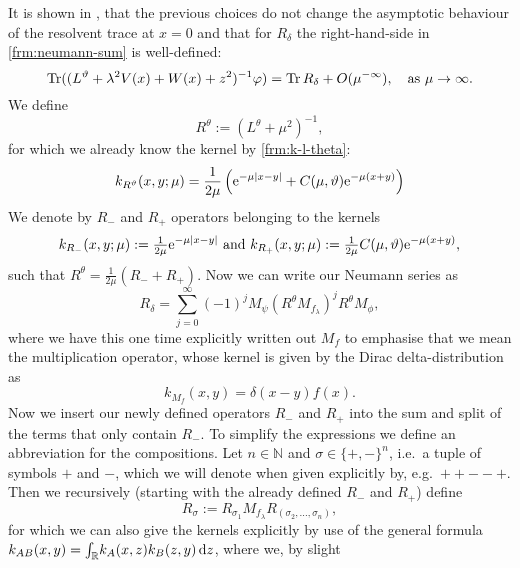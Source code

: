 It is shown in \cite[Sec.~2]{LV13}, that the previous choices do not change the
asymptotic behaviour of the resolvent trace at $x=0$ and that for $R_\delta$ the
right-hand-side in \cref{frm:neumann-sum} is well-defined:
\begin{equation*}
  \Tr((L^\theta + \lambda^2 V(x) + W(x) + z^2)^{-1}\phi) =
  \Tr R_\delta + O(\mu^{-\infty}), \quad \text{as } \mu\to\infty.
\end{equation*}
We define
\begin{equation}
  \label{frm:r-theta}
  R^\theta := (L^\theta + \mu^2)^{-1},
\end{equation}
for which we already know the kernel by \cref{frm:k-l-theta}:
\begin{equation*}
  k_{R^\theta}(x,y;\mu) = \frac1{2\mu} \left( \Eto{-\mu\Abs{x-y}} +
  C(\mu,\theta)\Eto{-\mu(x+y)}\right)
\end{equation*}
We denote by $R_-$ and $R_+$ operators belonging to the kernels
\begin{align*}
  k_{R_-}(x,y;\mu) := \tfrac1{2\mu}\Eto{-\mu\Abs{x-y}} \text{ and }
  k_{R_+}(x,y;\mu) := \tfrac1{2\mu}C(\mu,\theta)\Eto{-\mu(x+y)},
\end{align*}
such that $R^\theta = \tfrac1{2\mu}(R_- + R_+)$. Now we can write our Neumann
series as
\begin{equation*}
  R_\delta = \sum_{j=0}^\infty (-1)^j M_\psi (R^\theta
  M_{f_\lambda})^j R^\theta M_\phi,
\end{equation*}
where we have this one time explicitly written out $M_f$ to emphasise that we
mean the multiplication operator, whose kernel is given by the Dirac
delta-distribution as
\begin{equation*}
  k_{M_f}(x,y) = \delta(x-y)f(x).
\end{equation*}
Now we insert our newly defined operators $R_-$ and $R_+$ into the sum and split
of the terms that only contain $R_-$. To simplify the expressions we define an
abbreviation for the compositions. Let $n\in\mathbb{N}$ and $\sigma \in
\{+,-\}^n$, i.e.\ a tuple of symbols $+$ and $-$, which we will denote when
given explicitly by, e.g.\ $++--+$. Then we recursively (starting with the
already defined $R_-$ and $R_+$) define
\begin{equation}
  R_\sigma := R_{\sigma_1} M_{f_\lambda} R_{(\sigma_2,\ldots,\sigma_{n})},
\end{equation}
for which we can also give the kernels explicitly by use of the general formula
$k_{AB}(x,y) = \Integ{\mathbb{R}}{z}{k_A(x,z)k_B(z,y)}$, where we, by slight
